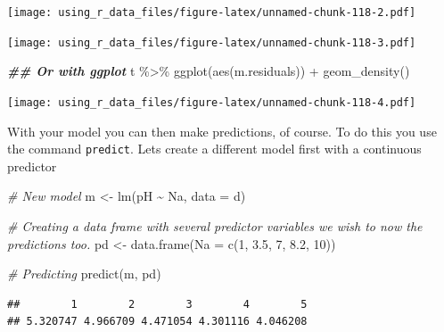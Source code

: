 \documentclass[
]{book}
\newenvironment{Shaded}{\begin{snugshade}}{\end{snugshade}}
\newcommand{\AttributeTok}[1]{\textcolor[rgb]{0.77,0.63,0.00}{#1}}
\newcommand{\CommentTok}[1]{\textcolor[rgb]{0.56,0.35,0.01}{\textit{#1}}}
\newcommand{\DecValTok}[1]{\textcolor[rgb]{0.00,0.00,0.81}{#1}}
\newcommand{\DocumentationTok}[1]{\textcolor[rgb]{0.56,0.35,0.01}{\textbf{\textit{#1}}}}
\newcommand{\FloatTok}[1]{\textcolor[rgb]{0.00,0.00,0.81}{#1}}
\newcommand{\FunctionTok}[1]{\textcolor[rgb]{0.00,0.00,0.00}{#1}}
\newcommand{\NormalTok}[1]{#1}
\newcommand{\OtherTok}[1]{\textcolor[rgb]{0.56,0.35,0.01}{#1}}
\newcommand{\SpecialCharTok}[1]{\textcolor[rgb]{0.00,0.00,0.00}{#1}}
\begin{document}
\texttt{[image: using\_r\_data\_files/figure-latex/unnamed-chunk-118-2.pdf]}

\begin{Shaded}
\end{Shaded}

\texttt{[image: using\_r\_data\_files/figure-latex/unnamed-chunk-118-3.pdf]}

\begin{Shaded}
\begin{Highlighting}[]
\DocumentationTok{\#\# Or with ggplot}
\NormalTok{t }\SpecialCharTok{\%\textgreater{}\%} 
  \FunctionTok{ggplot}\NormalTok{(}\FunctionTok{aes}\NormalTok{(m.residuals)) }\SpecialCharTok{+}
  \FunctionTok{geom\_density}\NormalTok{()}
\end{Highlighting}
\end{Shaded}

\texttt{[image: using\_r\_data\_files/figure-latex/unnamed-chunk-118-4.pdf]}

With your model you can then make predictions, of course. To do this you use the command \texttt{predict}. Lets create a different model first with a continuous predictor

\begin{Shaded}
\begin{Highlighting}[]
\CommentTok{\# New model}
\NormalTok{m }\OtherTok{\textless{}{-}} \FunctionTok{lm}\NormalTok{(pH }\SpecialCharTok{\textasciitilde{}}\NormalTok{ Na, }\AttributeTok{data =}\NormalTok{ d)}

\CommentTok{\# Creating a data frame with several predictor variables we wish to now the predictions too.}
\NormalTok{pd }\OtherTok{\textless{}{-}} \FunctionTok{data.frame}\NormalTok{(}\AttributeTok{Na =} \FunctionTok{c}\NormalTok{(}\DecValTok{1}\NormalTok{, }\FloatTok{3.5}\NormalTok{, }\DecValTok{7}\NormalTok{, }\FloatTok{8.2}\NormalTok{, }\DecValTok{10}\NormalTok{))}

\CommentTok{\# Predicting}
\FunctionTok{predict}\NormalTok{(m, pd)}
\end{Highlighting}
\end{Shaded}

\begin{verbatim}
##        1        2        3        4        5 
## 5.320747 4.966709 4.471054 4.301116 4.046208
\end{verbatim}
\end{document}
